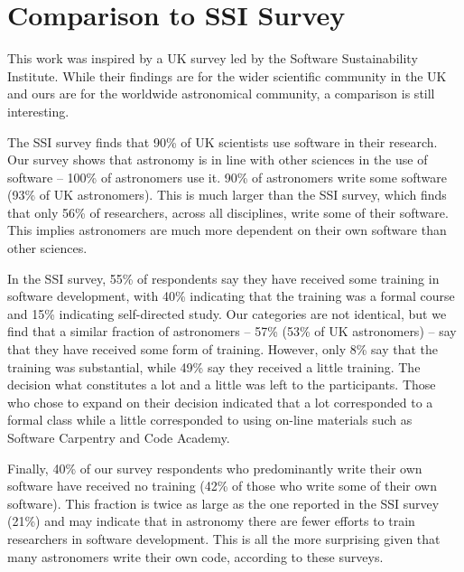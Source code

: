 \section{Comparison to SSI Survey}
\label{sec:ssicompare}

This work was inspired by a UK survey led by the Software Sustainability Institute. While their findings are for the wider scientific community in the UK and ours are for the worldwide astronomical community, a comparison is still interesting. 

The SSI survey finds that 90\% of UK scientists use software in their research. Our survey shows that astronomy is in line with other sciences in the use of software --  100\% of astronomers use it. 90\% of astronomers write some software (93\% of UK astronomers). This is much larger than the SSI survey, which finds that only 56\% of researchers, across all disciplines, write some of their software.  This implies astronomers are much more dependent on their own software than other sciences.

In the SSI survey, 55\% of respondents say they have received some training in software development, with 40\% indicating that the training was a formal course and 15\% indicating self-directed study. Our categories are not identical, but we find that a similar fraction of astronomers -- 57\% (53\% of UK astronomers) -- say that they have received some form of training. However, only 8\% say that the training was substantial, while 49\% say they received a little training. The decision what constitutes a lot and a little was left to the participants. Those who chose to expand on their decision indicated that a lot corresponded to a formal class while a little corresponded to using on-line materials such as Software Carpentry and Code Academy.

Finally, 40\% of our survey respondents who predominantly write their own software have received no training (42\% of those who write some of their own software). This fraction is twice as large as the one reported in the SSI survey (21\%) and may indicate that in astronomy there are fewer efforts to train researchers in software development.  This is all the more surprising given that many  astronomers write their own code, according to these surveys.



    
  
  
